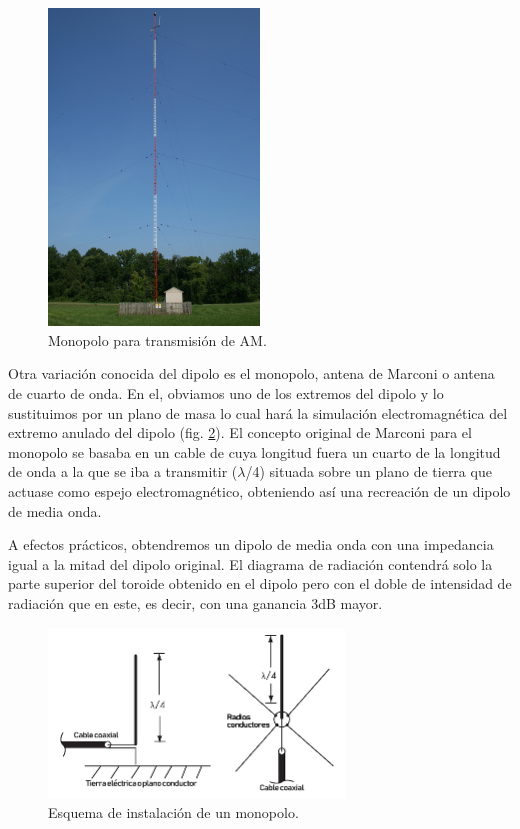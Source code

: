 \begin{figure}
\vspace{-20pt}
    \centering
        \includegraphics[width=0.5\textwidth]{archivos/monopolo/monopolo}
        \caption{Monopolo para transmisión de AM. \cite{Sagdejev2008}}
        \vspace{-30pt}
        \label{fig:monopoloam}
\end{figure}


\par Otra variación conocida del dipolo es el monopolo, antena de Marconi o antena de cuarto de onda. En el, obviamos uno de los extremos del dipolo y lo sustituimos por un plano de masa lo cual hará la simulación electromagnética del extremo anulado del dipolo (fig. \ref{fig:monopolo}). El concepto original de Marconi para el monopolo se basaba en un cable de cuya longitud fuera un cuarto de la longitud de onda a la que se iba a transmitir ($\lambda$/4) situada sobre un plano de tierra que actuase como espejo electromagnético, obteniendo así una recreación de un dipolo de media onda.
\\
\par A efectos prácticos, obtendremos un dipolo de media onda con una impedancia igual a la mitad del dipolo original. El diagrama de radiación contendrá solo la parte superior del toroide obtenido en el dipolo pero con el doble de intensidad de radiación que en este, es decir, con una ganancia 3dB mayor.
\\
\begin{figure}[h]
    \centering
        \includegraphics[width=0.7\textwidth]{archivos/monopolo/monoesquema}
        \caption{Esquema de instalación de un monopolo. \cite{Frenzel2013}}
        \label{fig:monopolo}
\end{figure}

